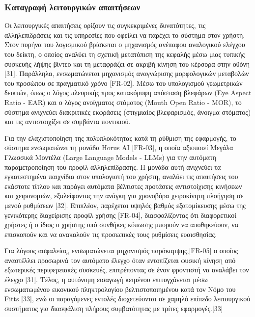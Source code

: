 \documentclass[twoside, a4paper, 11pt]{article}
\newcommand{\textlatin}[1]{\textenglish{#1}}
\begin{document}
\subsubsection{Καταγραφή λειτουργικών απαιτήσεων}
Οι λειτουργικές απαιτήσεις ορίζουν τις συγκεκριμένες δυνατότητες, τις αλληλεπιδράσεις και τις υπηρεσίες που οφείλει να παρέχει το σύστημα στον χρήστη.
Στον πυρήνα του λογισμικού βρίσκεται ο μηχανισμός ανέπαφου αναλογικού ελέγχου του δείκτη, ο οποίος αναλύει τη σχετική μετατόπιση της κεφαλής μέσω μιας τυπικής συσκευής λήψης βίντεο και τη μεταφράζει σε ακριβή κίνηση του κέρσορα στην οθόνη [31]. 
Παράλληλα, ενσωματώνεται μηχανισμός αναγνώρισης μορφολογικών μεταβολών του προσώπου σε πραγματικό χρόνο [FR-02]. Μέσω του υπολογισμού γεωμετρικών δεικτών, όπως ο λόγος πλευρικής προς κατακόρυφη απόσταση βλεφάρων (\textlatin{Eye Aspect Ratio - EAR}) και ο λόγος ανοίγματος στόματος (\textlatin{Mouth Open Ratio - MOR}), το σύστημα ανιχνεύει διακριτικές εκφράσεις (στιγμιαίος βλεφαρισμός, άνοιγμα στόματος) και τις αντιστοιχίζει σε συμβάντα ποντικιού.

Για την ελαχιστοποίηση της πολυπλοκότητας κατά τη ρύθμιση της εφαρμογής, το σύστημα ενσωματώνει τη μονάδα \textlatin{Horus AI} [FR-03], η οποία αξιοποιεί Μεγάλα Γλωσσικά Μοντέλα (\textlatin{Large Language Models - LLMs}) για την αυτόματη παραμετροποίηση του προφίλ αλληλεπίδρασης. 
Η μονάδα αυτή ανιχνεύει τα εγκατεστημένα παιχνίδια στον υπολογιστή του χρήστη, αναλύει τις απαιτήσεις του εκάστοτε τίτλου και παράγει αυτόματα βέλτιστες προτάσεις αντιστοίχισης κινήσεων και χειρονομιών, εξαλείφοντας την ανάγκη για χρονοβόρα χειροκίνητη πλοήγηση σε μενού ρυθμίσεων [32]. 
Επιπλέον, παρέχεται υψηλός βαθμός εξατομίκευσης μέσω της γενικότερης διαχείρισης προφίλ χρήσης [FR-04], διασφαλίζοντας ότι διαφορετικοί χρήστες ή ο ίδιος ο χρήστης υπό συνθήκες κόπωσης μπορούν να αποθηκεύουν, να επισκοπούν και να ανακαλούν τις προσωπικές τους ρυθμίσεις ευαισθησίας.

Για λόγους ασφαλείας, ενσωματώνεται μηχανισμός παράκαμψης,[FR-05] ο οποίος αναστέλλει προσωρινά τον αυτόματο έλεγχο όταν εντοπίζεται φυσική κίνηση από εξωτερικές περιφερειακές συσκευές, επιτρέποντας σε έναν φροντιστή να αναλάβει τον έλεγχο [31].
Τέλος, η αυτόνομη εισαγωγή κειμένου επιτυγχάνεται μέσω ενσωματωμένου εικονικού πληκτρολογίου βελτιστοποιημένου κατά τον Νόμο του \textlatin{Fitts} [33], ενώ οι παραγόμενες εντολές διοχετεύονται σε χαμηλό επίπεδο λειτουργικού συστήματος 
για διασφάλιση πλήρους συμβατότητας με τρίτες εφαρμογές.[33]
\end{document}
